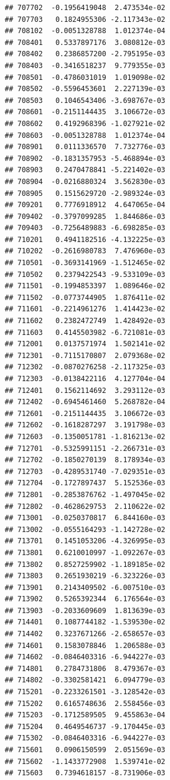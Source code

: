 \begin{frame}[fragile]
\begin{verbatim}
## 707702  -0.1956419048  2.473534e-02
## 707703   0.1824955306 -2.117343e-02
## 708102  -0.0051328788  1.012374e-04
## 708401   0.5337897176  3.080812e-03
## 708402   0.2386857200 -2.795195e-03
## 708403  -0.3416518237  9.779355e-03
## 708501  -0.4786031019  1.019098e-02
## 708502  -0.5596453601  2.227139e-03
## 708503   0.1046543406 -3.698767e-03
## 708601  -0.2151144435  3.106672e-03
## 708602   0.4192968396 -1.027921e-02
## 708603  -0.0051328788  1.012374e-04
## 708901   0.0111336570  7.732776e-03
## 708902  -0.1831357953 -5.468894e-03
## 708903   0.2470478841 -5.221402e-03
## 708904  -0.0216880324  3.562830e-03
## 708905   0.1515629720 -2.989324e-03
## 709201   0.7776918912  4.647065e-04
## 709402  -0.3797099285  1.844686e-03
## 709403  -0.7256489883 -6.698285e-03
## 710201   0.4941182516 -4.132225e-03
## 710202  -0.2616980783  7.476960e-03
## 710501  -0.3693141969 -1.512465e-02
## 710502   0.2379422543 -9.533109e-03
## 711501  -0.1994853397  1.089646e-02
## 711502  -0.0773744905  1.876411e-02
## 711601  -0.2214961276  1.414423e-02
## 711602   0.2382472749  1.428492e-03
## 711603   0.4145503982 -6.721081e-03
## 712001   0.0137571974  1.502141e-02
## 712301  -0.7115170807  2.079368e-02
## 712302  -0.0870276258 -2.117325e-03
## 712303  -0.0138422116  4.127704e-04
## 712401   0.1562114692  3.293112e-03
## 712402  -0.6945461460  5.268782e-04
## 712601  -0.2151144435  3.106672e-03
## 712602  -0.1618287297  3.191798e-03
## 712603  -0.1350051781 -1.816213e-02
## 712701  -0.5325991151 -2.266731e-03
## 712702  -0.1850270139  8.178934e-03
## 712703  -0.4289531740 -7.029351e-03
## 712704  -0.1727897437  5.152536e-03
## 712801  -0.2853876762 -1.497045e-02
## 712802  -0.4628629753  2.110622e-02
## 713001  -0.0250370817  6.844160e-03
## 713002  -0.0555164293 -1.142728e-02
## 713701   0.1451053206 -4.326995e-03
## 713801   0.6210010997 -1.092267e-03
## 713802   0.8527259902 -1.189185e-02
## 713803   0.2651930219 -6.323226e-03
## 713901   0.2143409502 -6.007510e-03
## 713902   0.5265392344  6.176564e-03
## 713903  -0.2033609609  1.813639e-03
## 714401   0.1087744182 -1.539530e-02
## 714402   0.3237671266 -2.658657e-03
## 714601   0.1583078846  1.206588e-03
## 714602  -0.0846403316 -6.944227e-03
## 714801   0.2784731806  8.479367e-03
## 714802  -0.3302581421  6.094779e-03
## 715201  -0.2233261501 -3.128542e-03
## 715202   0.6165748636  2.558456e-03
## 715203  -0.1712589505  9.455863e-04
## 715204   0.4649546737 -9.170445e-03
## 715302  -0.0846403316 -6.944227e-03
## 715601   0.0906150599  2.051569e-03
## 715602  -1.1433772908  1.539741e-02
## 715603   0.7394618157 -8.731906e-03

\end{verbatim}
\end{frame}
